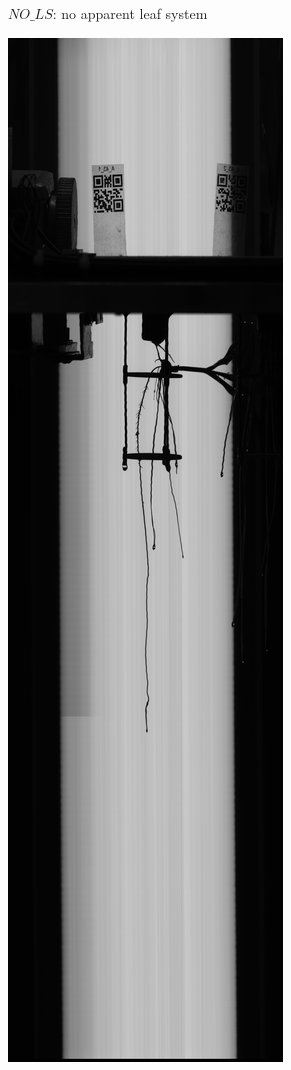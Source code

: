 \begin{figure}
\begin{subfigure}[t]{.13\textwidth}
  \caption{$NO\_LS$: no apparent leaf system}
  \label{fig:NO_LS}
\end{subfigure}
%
\begin{subfigure}[t]{.13\textwidth}
  \centering
  \includegraphics[width=\linewidth]{figures/BAD_LS.jpg}

\end{subfigure}
\end{figure}
